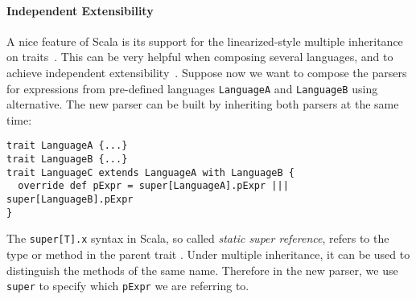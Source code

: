 \paragraph{Independent Extensibility}
A nice feature of Scala is its support for the linearized-style multiple
inheritance on traits~\cite{odersky2004overview}. This can be very helpful when
composing several languages, and to achieve independent
extensibility~\cite{odersky2005independently}. Suppose now we want to compose the parsers
for expressions from pre-defined languages \lstinline|LanguageA| and \lstinline|LanguageB| using alternative.
The new parser can be built by inheriting both parsers at the same time:
\vspace{-4pt}
\begin{lstlisting}
trait LanguageA {...}
trait LanguageB {...}
trait LanguageC extends LanguageA with LanguageB {
  override def pExpr = super[LanguageA].pExpr ||| super[LanguageB].pExpr
}
\end{lstlisting}\vspace{-4pt}

The \lstinline{super[T].x} syntax in Scala, so called \textit{static super reference}, refers to the type or method
 in the parent trait . Under multiple inheritance, it can be used to distinguish
the methods of the same name. Therefore in the new parser, we use \lstinline{super} to specify which
\lstinline{pExpr} we are referring to.



\begin{comment}
\bruno{You can present the abstract example, as you do
  here, but you should also present a concrete example. You
already have Var, maybe you can add another language extension for
boolean literals. Show the code for the boolean literals parsing as
well as the composition code.}

Interestingly note that, due to the use of multiple inheritance, we
need two different super calls.\bruno{expand here. People may not
be familiar with scala super calls, you have to explain what the
syntax does.}
\end{comment}


